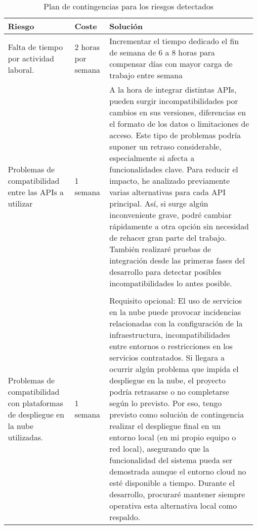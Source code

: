 \begin{table}[h!tb]
    \centering
    \begin{tabular}{|p{}|p{}|p{}|}
        \hline 
        \textbf{Riesgo} & \textbf{Coste} & \textbf{Solución} \\
        \hline 
        Falta de tiempo por actividad laboral. & 
        2 horas por semana & 
        Incrementar el tiempo dedicado el fin de semana de 6 a 8 horas para compensar días con mayor carga de trabajo entre semana \\
        \hline 
         Problemas de compatibilidad entre las \glspl{API} a utilizar & 1 semana & A la hora de integrar distintas \glspl{API}, pueden surgir incompatibilidades por cambios en sus versiones, diferencias en el formato de los datos o limitaciones de acceso. Este tipo de problemas podría suponer un retraso considerable, especialmente si afecta a funcionalidades clave. Para reducir el impacto, he analizado previamente varias alternativas para cada \gls{API} principal. Así, si surge algún inconveniente grave, podré cambiar rápidamente a otra opción sin necesidad de rehacer gran parte del trabajo. También realizaré pruebas de integración desde las primeras fases del desarrollo para detectar posibles incompatibilidades lo antes posible. \\ & 
      \\
        \hline 
        Problemas de compatibilidad con plataformas de despliegue en la nube utilizadas. & 
        1 semana & 
        Requisito opcional: El uso de servicios en la nube puede provocar incidencias relacionadas con la configuración de la infraestructura, incompatibilidades entre entornos o restricciones en los servicios contratados. Si llegara a ocurrir algún problema que impida el despliegue en la nube, el proyecto podría retrasarse o no completarse según lo previsto. Por eso, tengo previsto como solución de contingencia realizar el despliegue final en un entorno local (en mi propio equipo o red local), asegurando que la funcionalidad del sistema pueda ser demostrada aunque el entorno cloud no esté disponible a tiempo. Durante el desarrollo, procuraré mantener siempre operativa esta alternativa local como respaldo. \\
        \hline
    \end{tabular}

    \caption{Plan de contingencias para los riesgos detectados}
    \label{tbl:contingencia}
\end{table}

